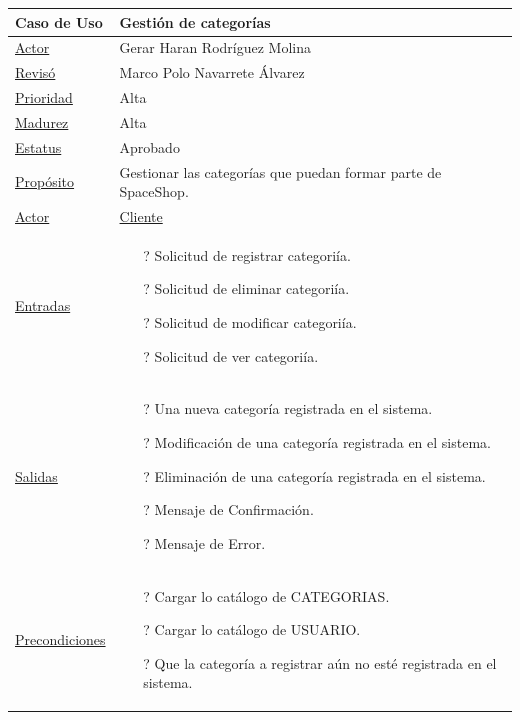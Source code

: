 				\begin{longtable}{p{4cm}|p{11cm}}
				\hline
					{Caso de Uso}&{Gesti\'on de categor\'ias}\\
				\hline
					{\hyperlink {Autor}{Actor}}&{Gerar Haran Rodr\'iguez Molina}\\
				\hline
					{\hyperlink {Reviso}{Revis\'o}}&{Marco Polo Navarrete \'Alvarez}\\
				\hline
					{\hyperlink {Prioridad}{Prioridad}}&{Alta}\\
				\hline
					{\hyperlink {Madurez}{Madurez}}&{Alta}\\
				\hline
					{\hyperlink {Estatus}{Estatus}}&{Aprobado}\\
				\hline
					{\hyperlink {Proposito}{Prop\'osito}}&{Gestionar las categor\'ias que puedan formar parte de SpaceShop.}\\
				\hline
					{\hyperlink {Actor}{Actor}}&{\hyperlink{Cliente}{Cliente} }\\
				\hline
					{\hyperlink {Entradas}{Entradas}}&{ 
					\begin{itemize}
						\item[?] Solicitud de registrar categori\'ia.
						\item[?] Solicitud de eliminar categori\'ia.
						\item[?] Solicitud de modificar categori\'ia.
						\item[?] Solicitud de ver categori\'ia.
					\end{itemize}	 
					}\\
				\hline
					{\hyperlink {Salidas}{Salidas}}&{
					\begin{itemize}
						\item[?] Una nueva categor\'ia registrada en el sistema.
						\item[?] Modificaci\'on de una categor\'ia registrada en el sistema.
						\item[?] Eliminaci\'on de una categor\'ia registrada en el sistema.
						\item[?] Mensaje de Confirmaci\'on.
						\item[?] Mensaje de Error.
					\end{itemize}		
					}\\

				\hline
					{\hyperlink {Precondiciones}{Precondiciones}}&{
					\begin{itemize}
						\item[?] Cargar lo cat\'alogo de CATEGORIAS.
						\item[?] Cargar lo cat\'alogo de USUARIO.
						\item[?] Que la categor\'ia a registrar a\'un no est\'e registrada en el sistema.
						\end{itemize}	
					}\\


\end{longtable}
